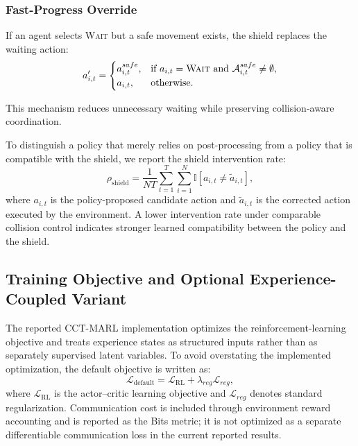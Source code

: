 \documentclass[preprint,12pt]{elsarticle}
\begin{document}
\subsubsection{Fast-Progress Override}

If an agent selects \textsc{Wait} but a safe movement exists, the shield replaces the waiting action:
\begin{equation}
a'_{i,t}
=
\begin{cases}
a^{safe}_{i,t}, & \text{if } a_{i,t}=\textsc{Wait} \text{ and } \mathcal{A}^{safe}_{i,t}\neq \emptyset,\\
a_{i,t}, & \text{otherwise}.
\end{cases}
\end{equation}

This mechanism reduces unnecessary waiting while preserving collision-aware coordination.

To distinguish a policy that merely relies on post-processing from a policy that is compatible with the shield, we report the shield intervention rate:
\begin{equation}
\rho_{\mathrm{shield}}=\frac{1}{NT}\sum_{t=1}^{T}\sum_{i=1}^{N}\mathbb{I}\left[a_{i,t}\neq \tilde{a}_{i,t}\right],
\label{eq:shield_intervention}
\end{equation}
where $a_{i,t}$ is the policy-proposed candidate action and $\tilde{a}_{i,t}$ is the corrected action executed by the environment. A lower intervention rate under comparable collision control indicates stronger learned compatibility between the policy and the shield.

\subsection{Training Objective and Optional Experience-Coupled Variant}

The reported CCT-MARL implementation optimizes the reinforcement-learning objective and treats experience states as structured inputs rather than as separately supervised latent variables. To avoid overstating the implemented optimization, the default objective is written as:
\begin{equation}
\mathcal{L}_{\mathrm{default}}=\mathcal{L}_{\mathrm{RL}}+\lambda_{reg}\mathcal{L}_{reg},
\end{equation}
where $\mathcal{L}_{\mathrm{RL}}$ is the actor--critic learning objective and $\mathcal{L}_{reg}$ denotes standard regularization. Communication cost is included through environment reward accounting and is reported as the Bits metric; it is not optimized as a separate differentiable communication loss in the current reported results.
\end{document}
